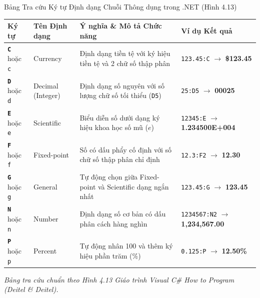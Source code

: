 \documentclass[aspectratio=169, 10pt]{beamer}
\begin{document}
\begin{frame}{Bảng Tra cứu Ký tự Định dạng Chuỗi Thông dụng trong .NET (Hình 4.13)}
  \begin{table}
    \centering\small
    \begin{tabularx}{\textwidth}{llXl}
      \toprule
      \textbf{Ký tự} & \textbf{Tên Định dạng} & \textbf{Ý nghĩa \& Mô tả Chức năng} & \textbf{Ví dụ Kết quả} \\
      \midrule
      \textbf{\texttt{C}} hoặc \texttt{c} & Currency & Định dạng tiền tệ với ký hiệu tiền tệ và 2 chữ số thập phân & \texttt{123.45:C} $\to$ \textbf{\$123.45} \\
      \textbf{\texttt{D}} hoặc \texttt{d} & Decimal (Integer) & Định dạng số nguyên với số lượng chữ số tối thiểu (\texttt{D5}) & \texttt{25:D5} $\to$ \textbf{00025} \\
      \textbf{\texttt{E}} hoặc \texttt{e} & Scientific & Biểu diễn số dưới dạng ký hiệu khoa học số mũ ($e$) & \texttt{12345:E} $\to$ \textbf{1.234500E+004} \\
      \textbf{\texttt{F}} hoặc \texttt{f} & Fixed-point & Số có dấu phẩy cố định với số chữ số thập phân chỉ định & \texttt{12.3:F2} $\to$ \textbf{12.30} \\
      \textbf{\texttt{G}} hoặc \texttt{g} & General & Tự động chọn giữa Fixed-point và Scientific dạng ngắn nhất & \texttt{123.45:G} $\to$ \textbf{123.45} \\
      \textbf{\texttt{N}} hoặc \texttt{n} & Number & Định dạng số cơ bản có dấu phân cách hàng nghìn & \texttt{1234567:N2} $\to$ \textbf{1,234,567.00} \\
      \textbf{\texttt{P}} hoặc \texttt{p} & Percent & Tự động nhân 100 và thêm ký hiệu phần trăm (\%) & \texttt{0.125:P} $\to$ \textbf{12.50\%} \\
      \bottomrule
    \end{tabularx}
  \end{table}
  \vspace{-1mm}
  \begin{center}
    \footnotesize \textit{Bảng tra cứu chuẩn theo Hình 4.13 Giáo trình Visual C\# How to Program (Deitel \& Deitel).}
  \end{center}
\end{frame}
\end{document}
